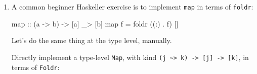\documentclass[]{article}
\newenvironment{Shaded}{}{}
\newcommand{\CommentTok}[1]{\textcolor[rgb]{0.38,0.63,0.69}{\textit{#1}}}
\newcommand{\DataTypeTok}[1]{\textcolor[rgb]{0.56,0.13,0.00}{#1}}
\newcommand{\DecValTok}[1]{\textcolor[rgb]{0.25,0.63,0.44}{#1}}
\newcommand{\FunctionTok}[1]{\textcolor[rgb]{0.02,0.16,0.49}{#1}}
\newcommand{\KeywordTok}[1]{\textcolor[rgb]{0.00,0.44,0.13}{\textbf{#1}}}
\newcommand{\NormalTok}[1]{#1}
\newcommand{\OtherTok}[1]{\textcolor[rgb]{0.00,0.44,0.13}{#1}}
\renewcommand{\href}[2]{#2\footnote{\url{#1}}}
\begin{document}
\begin{enumerate}
  Write a similar type \texttt{IsOdd\ n} that can only be constructed if
  \texttt{n} is \emph{odd}.

\begin{Shaded}
\begin{Highlighting}[]
\KeywordTok{type} \DataTypeTok{IsOdd}\NormalTok{ n }\FunctionTok{=} \DataTypeTok{Sigma} \DataTypeTok{Nat}\NormalTok{ (}\FunctionTok{????}\NormalTok{ n)}
\end{Highlighting}
\end{Shaded}

  And construct a proof that \texttt{7} is odd:

\begin{Shaded}
\begin{Highlighting}[]
\CommentTok{-- source: https://github.com/mstksg/inCode/tree/master/code-samples/singletons/Door4Final.hs#L223-L223}

\OtherTok{sevenIsOdd ::} \DataTypeTok{IsOdd} \DecValTok{7}
\end{Highlighting}
\end{Shaded}

  \href{https://github.com/mstksg/inCode/tree/master/code-samples/singletons/Door3.hs\#L165-L165}{Solution
  here!}

  On a sad note, one exercise I'd like to be able to add is to ask you to write
  decision functions and proofs for \texttt{IsEven} and \texttt{IsOdd}.
  Unfortunately, \texttt{Nat} is not rich enough to support this out of the box
  without a lot of extra tooling!
\item
  A common beginner Haskeller exercise is to implement \texttt{map} in terms of
  \texttt{foldr}:

\begin{Shaded}
\begin{Highlighting}[]
\NormalTok{map}\OtherTok{ ::}\NormalTok{ (a }\OtherTok{->}\NormalTok{ b) }\OtherTok{->}\NormalTok{ [a] _}\FunctionTok{>}\NormalTok{ [b]}
\NormalTok{map f }\FunctionTok{=}\NormalTok{ foldr ((}\FunctionTok{:}\NormalTok{) }\FunctionTok{.}\NormalTok{ f) []}
\end{Highlighting}
\end{Shaded}

  Let's do the same thing at the type level, manually.

  Directly implement a type-level \texttt{Map}, with kind
  \texttt{(j\ \textasciitilde{}\textgreater{}\ k)\ -\textgreater{}\ {[}j{]}\ -\textgreater{}\ {[}k{]}},
  in terms of \texttt{Foldr}:


\end{enumerate}
\end{document}
